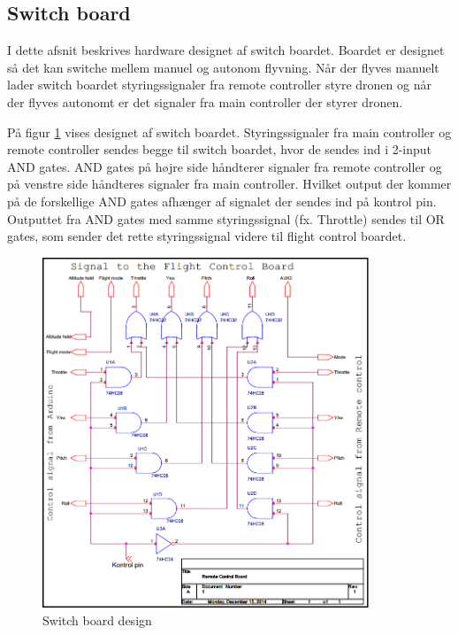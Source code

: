 \newpage
\subsection*{Switch board}
\vspace{-0.4cm}
I dette afsnit beskrives hardware designet af switch boardet. Boardet er designet så det kan switche mellem manuel og autonom flyvning. Når der flyves manuelt lader switch boardet styringssignaler fra remote controller styre dronen og når der flyves autonomt er det signaler fra main controller der styrer dronen.

På figur \ref{fig:switchboard_design} vises designet af switch boardet.
Styringssignaler fra main controller og remote controller sendes begge til switch boardet, hvor de sendes ind i 2-input AND gates. AND gates på højre side håndterer signaler fra remote controller og på venstre side håndteres signaler fra main controller. Hvilket output der kommer på de forskellige AND gates afhænger af signalet der sendes ind på kontrol pin. Outputtet fra AND gates med samme styringssignal (fx. Throttle) sendes til OR gates, som sender det rette styringssignal videre til flight control boardet. 


\begin{figure}[H]
	\centering
	\includegraphics[width=0.87\textwidth]{Billeder/hardware/switch_board_diagram.png}
	\caption{Switch board design}
	\label{fig:switchboard_design}
\end{figure}


